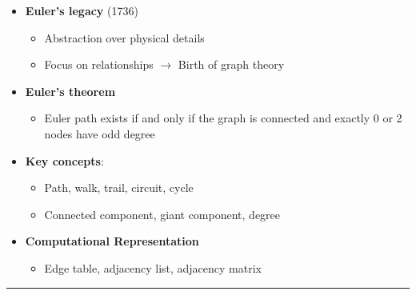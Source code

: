 \documentclass[
  letterpaper,
  DIV=11,
  numbers=noendperiod,
  oneside]{scrartcl}
\providecommand{\tightlist}{%
  \setlength{\itemsep}{0pt}\setlength{\parskip}{0pt}}
\begin{document}
\begin{itemize}
\tightlist
\item
  \textbf{Euler's legacy} (1736)

  \begin{itemize}
  \tightlist
  \item
    Abstraction over physical details
  \item
    Focus on relationships \(\rightarrow\) Birth of graph theory
  \end{itemize}
\item
  \textbf{Euler's theorem}

  \begin{itemize}
  \tightlist
  \item
    {Euler path} exists if and only if the graph is {connected} and
    exactly 0 or 2 nodes have odd {degree}
  \end{itemize}
\item
  \textbf{Key concepts}:

  \begin{itemize}
  \tightlist
  \item
    Path, walk, trail, circuit, cycle
  \item
    Connected component, giant component, degree
  \end{itemize}
\item
  \textbf{Computational Representation}

  \begin{itemize}
  \tightlist
  \item
    Edge table, adjacency list, adjacency matrix
  \end{itemize}
\end{itemize}

\begin{center}\rule{0.5\linewidth}{0.5pt}\end{center}
\end{document}
